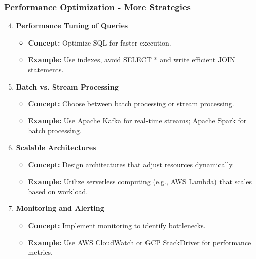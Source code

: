 \documentclass[aspectratio=169]{beamer}
\begin{document}
\begin{frame}[fragile]
    \frametitle{Performance Optimization - More Strategies}
    \begin{enumerate}
        \setcounter{enumi}{3}
        \item \textbf{Performance Tuning of Queries}
            \begin{itemize}
                \item \textbf{Concept:} Optimize SQL for faster execution.
                \item \textbf{Example:} Use indexes, avoid SELECT * and write efficient JOIN statements.
            \end{itemize}
        \item \textbf{Batch vs. Stream Processing}
            \begin{itemize}
                \item \textbf{Concept:} Choose between batch processing or stream processing.
                \item \textbf{Example:} Use Apache Kafka for real-time streams; Apache Spark for batch processing.
            \end{itemize}
        \item \textbf{Scalable Architectures}
            \begin{itemize}
                \item \textbf{Concept:} Design architectures that adjust resources dynamically.
                \item \textbf{Example:} Utilize serverless computing (e.g., AWS Lambda) that scales based on workload.
            \end{itemize}
        \item \textbf{Monitoring and Alerting}
            \begin{itemize}
                \item \textbf{Concept:} Implement monitoring to identify bottlenecks.
                \item \textbf{Example:} Use AWS CloudWatch or GCP StackDriver for performance metrics.
            \end{itemize}
    \end{enumerate}
\end{frame}
\end{document}
